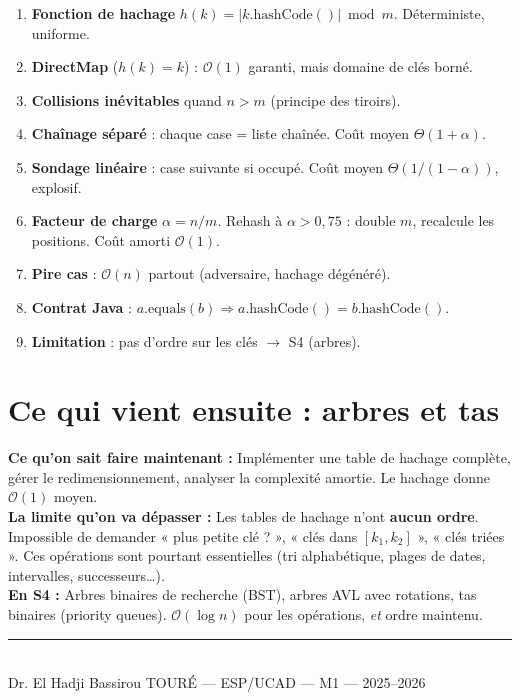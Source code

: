 \documentclass[11pt,a4paper]{article}
\newcommand{\bigO}{\mathcal{O}}
\begin{document}
\begin{retenirbox}[Synthèse S03]
\begin{enumerate}
    \item \textbf{Fonction de hachage} $h(k) = |k.\text{hashCode}()| \bmod m$. Déterministe, uniforme.
    \item \textbf{DirectMap} ($h(k) = k$) : $\bigO(1)$ garanti, mais domaine de clés borné.
    \item \textbf{Collisions inévitables} quand $n > m$ (principe des tiroirs).
    \item \textbf{Chaînage séparé} : chaque case = liste chaînée. Coût moyen $\Theta(1 + \alpha)$.
    \item \textbf{Sondage linéaire} : case suivante si occupé. Coût moyen $\Theta(1/(1-\alpha))$, explosif.
    \item \textbf{Facteur de charge} $\alpha = n/m$. Rehash à $\alpha > 0{,}75$ : double $m$, recalcule les positions. Coût amorti $\bigO(1)$.
    \item \textbf{Pire cas} : $\bigO(n)$ partout (adversaire, hachage dégénéré).
    \item \textbf{Contrat Java} : $a.\text{equals}(b) \Rightarrow a.\text{hashCode}() = b.\text{hashCode}()$.
    \item \textbf{Limitation} : pas d'ordre sur les clés $\to$ S4 (arbres).
\end{enumerate}
\end{retenirbox}

\section*{Ce qui vient ensuite : arbres et tas}

\begin{prereqbox}
\textbf{Ce qu'on sait faire maintenant :} Implémenter une table de hachage complète, gérer le redimensionnement, analyser la complexité amortie. Le hachage donne $\bigO(1)$ moyen.\\[4pt]
\textbf{La limite qu'on va dépasser :} Les tables de hachage n'ont \textbf{aucun ordre}. Impossible de demander « plus petite clé ? », « clés dans $[k_1, k_2]$ », « clés triées ». Ces opérations sont pourtant essentielles (tri alphabétique, plages de dates, intervalles, successeurs\ldots).\\[4pt]
\textbf{En S4 :} Arbres binaires de recherche (BST), arbres AVL avec rotations, tas binaires (priority queues). $\bigO(\log n)$ pour les opérations, \emph{et} ordre maintenu.
\end{prereqbox}

\vfill
\begin{center}
\rule{0.6\textwidth}{0.4pt}\\[6pt]
{\small Dr. El Hadji Bassirou TOURÉ --- ESP/UCAD --- M1 --- 2025--2026}
\end{center}
\end{document}
